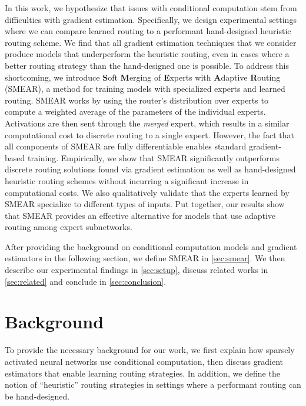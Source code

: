 \documentclass{article}
\theoremstyle{plain}
\theoremstyle{definition}
\theoremstyle{remark}
\begin{document}
In this work, we hypothesize that issues with conditional computation stem from difficulties with gradient estimation.
Specifically, we design experimental settings where we can compare learned routing to a performant hand-designed heuristic routing scheme.
We find that all gradient estimation techniques that we consider produce models that underperform the heuristic routing, even in cases where a better routing strategy than the hand-designed one is possible.
To address this shortcoming, we introduce \textbf{S}oft \textbf{M}erging of \textbf{E}xperts with \textbf{A}daptive \textbf{R}outing (SMEAR), a method for training models with specialized experts and learned routing.
SMEAR works by using the router's distribution over experts to compute a weighted average of the parameters of the individual experts.
Activations are then sent through the \textit{merged} expert, which results in a similar computational cost to discrete routing to a single expert.
However, the fact that all components of SMEAR are fully differentiable enables standard gradient-based training.
Empirically, we show that SMEAR significantly outperforms discrete routing solutions found via gradient estimation as well as hand-designed heuristic routing schemes without incurring a significant increase in computational costs.
We also qualitatively validate that the experts learned by SMEAR specialize to different types of inputs.
Put together, our results show that SMEAR provides an effective alternative for models that use adaptive routing among expert subnetworks.

After providing the background on conditional computation models and gradient estimators in the following section, we define SMEAR in \cref{sec:smear}.
We then describe our experimental findings in \cref{sec:setup}, discuss related works in \cref{sec:related} and conclude in \cref{sec:conclusion}.

\section{Background}
\label{sec:background}

To provide the necessary background for our work, we first explain how sparsely activated neural networks use conditional computation, then discuss gradient estimators that enable learning routing strategies.
In addition, we define the notion of ``heuristic'' routing strategies in settings where a performant routing can be hand-designed.
\end{document}
